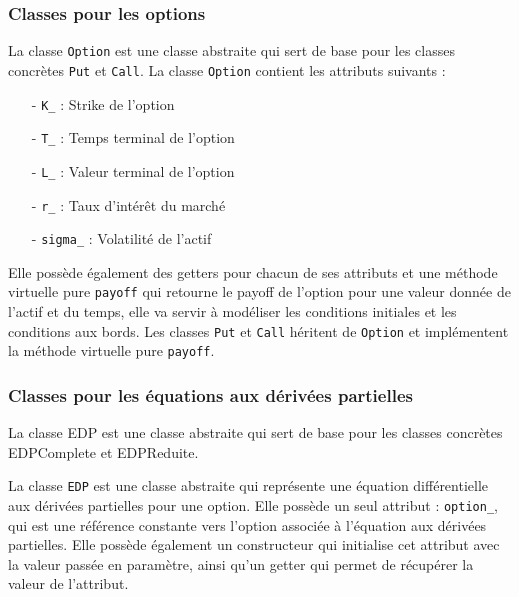 \documentclass[11pt,a4paper]{article}
\begin{document}
\vspace{0.5cm}

\subsubsection{Classes pour les options}

La classe \verb|Option| est une classe abstraite qui sert de base pour les classes concrètes \verb|Put| et \verb|Call|. La classe \verb|Option| contient les attributs suivants :

\vspace{0.5cm}

\begin{itemize}
    \item[-] \verb|K_| : Strike de l'option
    \item[-] \verb|T_| : Temps terminal de l'option
    \item[-] \verb|L_| : Valeur terminal de l'option
    \item[-] \verb|r_| : Taux d'intérêt du marché
    \item[-] \verb|sigma_| : Volatilité de l'actif
\end{itemize}

\vspace{0.5cm}

Elle possède également des getters pour chacun de ses attributs et une méthode virtuelle pure \verb|payoff| qui retourne le payoff de l'option pour une valeur donnée de l'actif et du temps, elle va servir à modéliser les conditions initiales et les conditions aux bords. Les classes \verb|Put| et \verb|Call| héritent de \verb|Option| et implémentent la méthode virtuelle pure \verb|payoff|.

\vspace{1cm}

\subsubsection{Classes pour les équations aux dérivées partielles}

La classe EDP est une classe abstraite qui sert de base pour les classes concrètes EDPComplete et EDPReduite.

\vspace{0.5cm}

La classe \verb|EDP| est une classe abstraite qui représente une équation différentielle aux dérivées partielles pour une option. Elle possède un seul attribut : \verb|option_|, qui est une référence constante vers l'option associée à l'équation aux dérivées partielles. Elle possède également un constructeur qui initialise cet attribut avec la valeur passée en paramètre, ainsi qu'un getter qui permet de récupérer la valeur de l'attribut.
\end{document}
